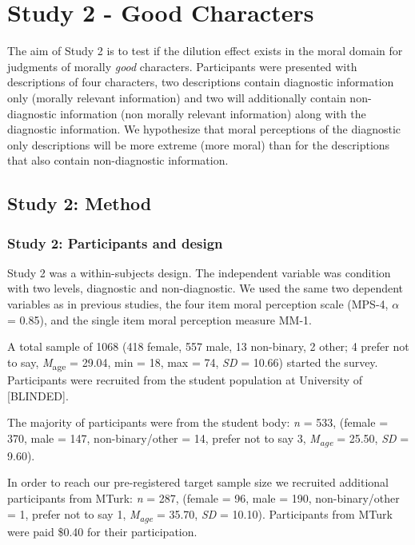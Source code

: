 \documentclass[
  english,
  man,floatsintext]{apa7}
\begin{document}
\hypertarget{study-2---good-characters}{%
\section{Study 2 - Good Characters}\label{study-2---good-characters}}

The aim of Study 2 is to test if the dilution effect exists in the moral domain for judgments of morally \emph{good} characters. Participants were presented with descriptions of four characters, two descriptions contain diagnostic information only (morally relevant information) and two will additionally contain non-diagnostic information (non morally relevant information) along with the diagnostic information. We hypothesize that moral perceptions of the diagnostic only descriptions will be more extreme (more moral) than for the descriptions that also contain non-diagnostic information.

\hypertarget{study-2-method}{%
\subsection{Study 2: Method}\label{study-2-method}}

\hypertarget{study-2-participants-and-design}{%
\subsubsection{Study 2: Participants and design}\label{study-2-participants-and-design}}

Study 2 was a within-subjects design. The independent variable was condition with two levels, diagnostic and non-diagnostic. We used the same two dependent variables as in previous studies, the four item moral perception scale (MPS-4, \(\alpha\) = 0.85), and the single item moral perception measure MM-1.

A total sample of 1068 (418 female, 557 male, 13 non-binary, 2 other; 4 prefer not to say, \emph{M}\textsubscript{age} = 29.04, min = 18, max = 74, \emph{SD} = 10.66) started the survey. Participants were recruited from the student population at University of {[}BLINDED{]}.

The majority of participants were from the student body: \emph{n} = 533, (female = 370, male = 147, non-binary/other = 14, prefer not to say 3, \emph{M\textsubscript{age}} = 25.50, \emph{SD} = 9.60).

In order to reach our pre-registered target sample size we recruited additional participants from MTurk: \emph{n} = 287, (female = 96, male = 190, non-binary/other = 1, prefer not to say 1, \emph{M\textsubscript{age}} = 35.70, \emph{SD} = 10.10). Participants from MTurk were paid \$0.40 for their participation.
\end{document}
